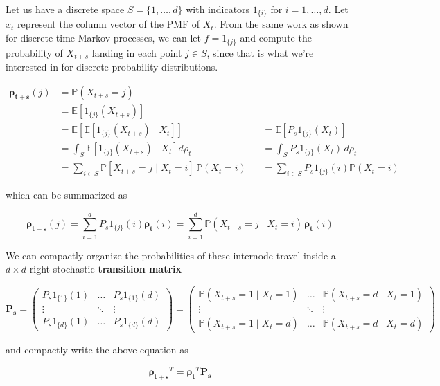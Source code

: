 \documentclass{article}
\begin{document}
  \begin{example}
    Let us have a discrete space $S = \{1, \ldots, d\}$ with indicators $1_{\{i\}}$ for $i = 1, \ldots, d$. Let $x_t$ represent the column vector of the PMF of $X_t$. From the same work as shown for discrete time Markov processes, we can let $f = 1_{\{j\}}$ and compute the probability of $X_{t + s}$ landing in each point $j \in S$, since that is what we're interested in for discrete probability distributions. 

    \begin{align*}
      \boldsymbol{\rho_{t + s}} (j) & = \mathbb{P}( X_{t + s} = j) \\ 
      & = \mathbb{E}[1_{\{j\}} (X_{t + s})] \\
      & = \mathbb{E} [ \mathbb{E}[ 1_{\{j\}} (X_{t + s}) \mid X_t] ] && = \mathbb{E}[P_s 1_{\{j\}} (X_t)] \\
      & = \int_S \mathbb{E}[ 1_{\{j\}} (X_{t + s}) \mid X_t] d\rho_t && = \int_S P_s 1_{\{j\}} (X_t) \,d \rho_t \\
      & = \sum_{i \in S} \mathbb{P}[ X_{t + s} = j \mid X_t = i] \, \mathbb{P} ( X_t = i) && = \sum_{i \in S} P_s 1_{\{j\}} (i) \mathbb{P}(X_t = i) 
    \end{align*}

    which can be summarized as 

      \[\boldsymbol{\rho_{t + s}} (j) = \sum_{i = 1}^d P_s 1_{\{j\}} (i) \boldsymbol{\rho_t} (i) = \sum_{i = 1}^d \mathbb{P}(X_{t + s} = j \mid X_t = i) \, \boldsymbol{\rho_t} (i)\]

    We can compactly organize the probabilities of these internode travel inside a $d \times d$ right stochastic \textbf{transition matrix}

      \[\mathbf{P_s} = \begin{pmatrix} P_s 1_{\{1\}} (1) & \ldots & P_s 1_{\{1\}} (d) \\ \vdots & \ddots & \vdots \\ P_s 1_{\{d\}} (1) & \ldots & P_s 1_{\{d\}} (d) \end{pmatrix} = \begin{pmatrix} \mathbb{P}(X_{t + s} = 1 \mid X_t = 1) & \ldots & \mathbb{P}(X_{t + s} = d \mid X_t = 1) \\ \vdots & \ddots & \vdots \\ \mathbb{P}(X_{t + s} = 1 \mid X_t = d) & \ldots & \mathbb{P}(X_{t + s} = d \mid X_t = d) \end{pmatrix} \]

    and compactly write the above equation as 

      \[\boldsymbol{\rho_{t + s}}^T = \boldsymbol{\rho_{t}}^T \mathbf{P_s}\]
  \end{example}
\end{document}
